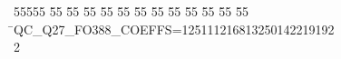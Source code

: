 %
%
\begin{tabbing}
55555 \= 55 \= 55 \= 55 \= 55 \= 55 \= 55 \= 55 \= 55 \= 55 \= 55 \= 55 \= 55 \= \>QC\_Q27\_FO388\_COEFFS=125111216813250142219192\\[0pt]
2\>\end{tabbing}

